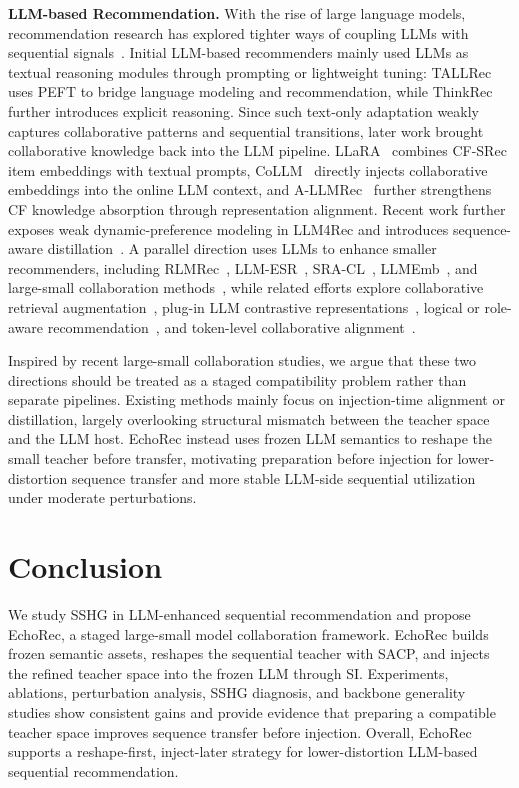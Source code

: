 ﻿\documentclass{article}
\begin{document}
\noindent\textbf{LLM-based Recommendation.} With the rise of large language models, recommendation research has explored tighter ways of coupling LLMs with sequential signals~\cite{lin2025survey,zhao2024era}. Initial LLM-based recommenders mainly used LLMs as textual reasoning modules through prompting or lightweight tuning: TALLRec~\cite{bao2023tallrec} uses PEFT to bridge language modeling and recommendation, while ThinkRec~\cite{yu2026thinkrec} further introduces explicit reasoning. Since such text-only adaptation weakly captures collaborative patterns and sequential transitions, later work brought collaborative knowledge back into the LLM pipeline. LLaRA~\cite{liao2024llara} combines CF-SRec item embeddings with textual prompts, CoLLM~\cite{zhang2025collm} directly injects collaborative embeddings into the online LLM context, and A-LLMRec~\cite{kim2024allmrec} further strengthens CF knowledge absorption through representation alignment. Recent work further exposes weak dynamic-preference modeling in LLM4Rec and introduces sequence-aware distillation~\cite{kim2025lost}. A parallel direction uses LLMs to enhance smaller recommenders, including RLMRec~\cite{ren2024rlmrec}, LLM-ESR~\cite{liu2024llmesr}, SRA-CL~\cite{cui2025sracl}, LLMEmb~\cite{liu2025llmemb}, and large-small collaboration methods~\cite{zhang2026crossscale,lv2025lsc4rec}, while related efforts explore collaborative retrieval augmentation~\cite{wu2024coral}, plug-in LLM contrastive representations~\cite{wang2025piccdr}, logical or role-aware recommendation~\cite{yu2025tagcf}, and token-level collaborative alignment~\cite{lin2026tca4rec}.

Inspired by recent large-small collaboration studies, we argue that these two directions should be treated as a staged compatibility problem rather than separate pipelines. Existing methods mainly focus on injection-time alignment or distillation, largely overlooking structural mismatch between the teacher space and the LLM host. EchoRec instead uses frozen LLM semantics to reshape the small teacher before transfer, motivating preparation before injection for lower-distortion sequence transfer and more stable LLM-side sequential utilization under moderate perturbations.
 
\section{Conclusion}
We study SSHG in LLM-enhanced sequential recommendation and propose EchoRec, a staged large-small model collaboration framework. EchoRec builds frozen semantic assets, reshapes the sequential teacher with SACP, and injects the refined teacher space into the frozen LLM through SI. Experiments, ablations, perturbation analysis, SSHG diagnosis, and backbone generality studies show consistent gains and provide evidence that preparing a compatible teacher space improves sequence transfer before injection. Overall, EchoRec supports a reshape-first, inject-later strategy for lower-distortion LLM-based sequential recommendation.
\end{document}
